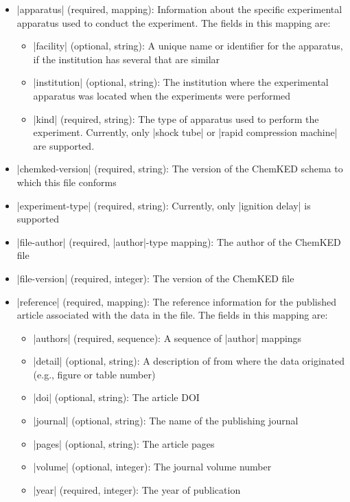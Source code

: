 \documentclass[12pt]{ijck}
\newcommand\ck{ChemKED}
\begin{document}
\begin{itemize}
    \item \yabox|apparatus| (required, mapping): Information about the specific experimental
    apparatus used to conduct the experiment. The fields in this mapping are:
    \begin{itemize}
        \item \yabox|facility| (optional, string): A unique name or identifier for the apparatus,
        if the institution has several that are similar
        \item \yabox|institution| (optional, string): The institution where the experimental
        apparatus was located when the experiments were performed
        \item \yabox|kind| (required, string): The type of apparatus used to
        perform the experiment. Currently, only \yabox|shock tube| or
        \yabox|rapid compression machine| are supported.
    \end{itemize}
    \item \yabox|chemked-version| (required, string): The version of the \ck{}
    schema to which this file conforms
    \item \yabox|experiment-type| (required, string): Currently, only
    \yabox|ignition delay| is supported
    \item \yabox|file-author| (required, \yabox|author|-type mapping): The
    author of the \ck{} file
    \item \yabox|file-version| (required, integer): The version of the \ck{}
    file
    \item \yabox|reference| (required, mapping): The reference information for
    the published article associated with the data in the file. The fields in this
    mapping are:
    \begin{itemize}
        \item \yabox|authors| (required, sequence): A sequence of \yabox|author|
        mappings
        \item \yabox|detail| (optional, string): A description of from where the
        data originated (e.g., figure or table number)
        \item \yabox|doi| (optional, string): The article DOI
        \item \yabox|journal| (optional, string): The name of the publishing
        journal
        \item \yabox|pages| (optional, string): The article pages
        \item \yabox|volume| (optional, integer): The journal volume number
        \item \yabox|year| (required, integer): The year of publication
    \end{itemize}
\end{itemize}
\end{document}
